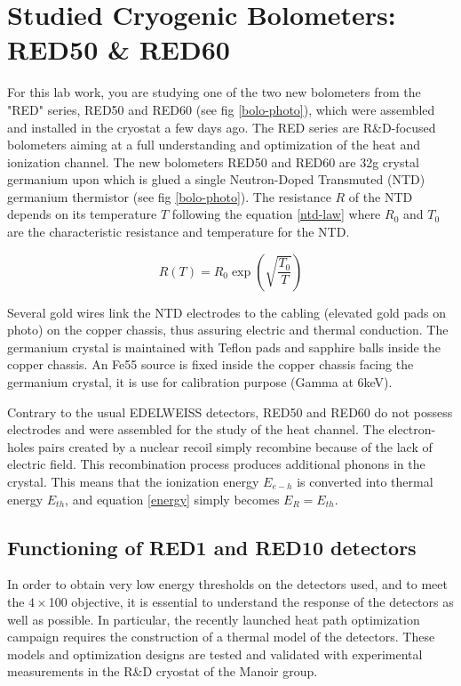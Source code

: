 \section{Studied Cryogenic Bolometers: RED50 \& RED60}

For this lab work, you are studying one of the two new bolometers from the "RED" series, RED50 and RED60 (see fig \ref{bolo-photo}), which were assembled and installed in the cryostat a few days ago. The RED series are R\&D-focused bolometers aiming at a full understanding and optimization of the heat and ionization channel. The new bolometers RED50 and RED60 are 32g crystal germanium upon which is glued a single Neutron-Doped Transmuted (NTD) germanium thermistor (see fig \ref{bolo-photo}). The resistance $R$ of the NTD depends on its temperature $T$ following the equation \ref{ntd-law} where $R_0$ and $T_0$ are the characteristic resistance and temperature for the NTD.

\begin{equation}
\label{ntd-law}
R(T) = R_0 \exp \left( \sqrt{ \frac{T_0}{T} } \right)
\end{equation}

Several gold wires link the NTD electrodes to the cabling (elevated gold pads on photo) on the copper chassis, thus assuring electric and thermal conduction. The germanium crystal is maintained with Teflon pads and sapphire balls inside the copper chassis. An Fe55 source is fixed inside the copper chassis facing the germanium crystal, it is use for calibration purpose (Gamma at 6keV).

Contrary to the usual EDELWEISS detectors, RED50 and RED60 do not possess electrodes and were assembled for the study of the heat channel. The electron-holes pairs created by a nuclear recoil simply recombine because of the lack of electric field. This recombination process produces additional phonons in the crystal. This means that the ionization energy $E_{e-h}$ is converted into thermal energy $E_{th}$, and equation \ref{energy} simply becomes $E_R = E_{th}$.



\subsection{Functioning of RED1 and RED10 detectors}

In order to obtain very low energy thresholds on the detectors used, and to meet the $4\times $100 objective, it is essential to understand the response of the detectors as well as possible. In particular, the recently launched heat path optimization campaign requires the construction of a thermal model of the detectors. These models and optimization designs are tested and validated with experimental measurements in the R\&D cryostat of the Manoir group.

